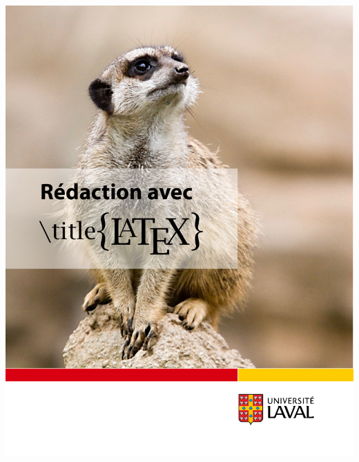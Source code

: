 \begin{frame}
\begin{columns}
\begin{column}{.4\textwidth}
      \includegraphics[height=0.8\textheight,frame]{formation-latex-ul}
    \end{column}
  \end{columns}
\end{frame}

